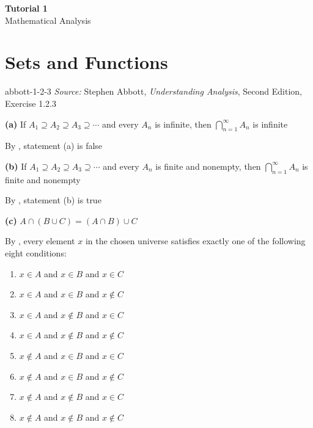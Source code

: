 \documentclass[12pt]{article}
\newcommand{\abbottexercise}[1]{%
  \emph{Source:} Stephen Abbott, \emph{Understanding Analysis}, Second
  Edition, Exercise #1\par\smallskip
}
\begin{document}
\begin{center}
  {\LARGE\bfseries Tutorial 1}\\[0.25em]
  {\large Mathematical Analysis}\\[0.15em]
\end{center}

\section{Sets and Functions}

\begin{ex}{abbott-1-2-3}
\abbottexercise{1.2.3}
\end{ex}

\textbf{(a)} If $A_1 \supseteq A_2 \supseteq A_3 \supseteq \cdots$ and
every $A_n$ is infinite, then $\bigcap_{n=1}^{\infty} A_n$ is infinite

By , statement (a) is false

\medskip
\noindent\textbf{(b)} If $A_1 \supseteq A_2 \supseteq A_3 \supseteq \cdots$
and every $A_n$ is finite and nonempty, then
$\bigcap_{n=1}^{\infty} A_n$ is finite and nonempty

By , statement (b) is true

\medskip
\noindent\textbf{(c)} $A \cap (B \cup C) = (A \cap B) \cup C$

By , every element \(x\) in the chosen
universe satisfies exactly one of the following eight conditions:
\begin{enumerate}[nosep] 
\item $x \in A$ and $x \in B$ and $x \in C$
\item $x \in A$ and $x \in B$ and $x \notin C$
\item $x \in A$ and $x \notin B$ and $x \in C$
\item $x \in A$ and $x \notin B$ and $x \notin C$
\item $x \notin A$ and $x \in B$ and $x \in C$
\item $x \notin A$ and $x \in B$ and $x \notin C$
\item $x \notin A$ and $x \notin B$ and $x \in C$
\item $x \notin A$ and $x \notin B$ and $x \notin C$
\end{enumerate} 
\end{document}
